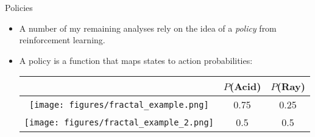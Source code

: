 \documentclass{beamer}
\begin{document}
\begin{frame}{Policies}
\begin{itemize}
\item A number of my remaining analyses rely on the idea of a \emph{policy} from reinforcement learning.
\item<2-> A policy is a function that maps states to action probabilities:
\begin{center}
\begin{table}

\begin{tabular}{|c|c|c|}
\hline 
& \(P\)(Acid) & \(P\)(Ray) \\
\hline
\texttt{[image: figures/fractal\_example.png]} & 0.75 & 0.25\\ \hline
\texttt{[image: figures/fractal\_example\_2.png]} & 0.5 & 0.5 \\ \hline
\end{tabular}
\end{table}
\end{center}
\end{itemize}
\end{frame}
\end{document}
